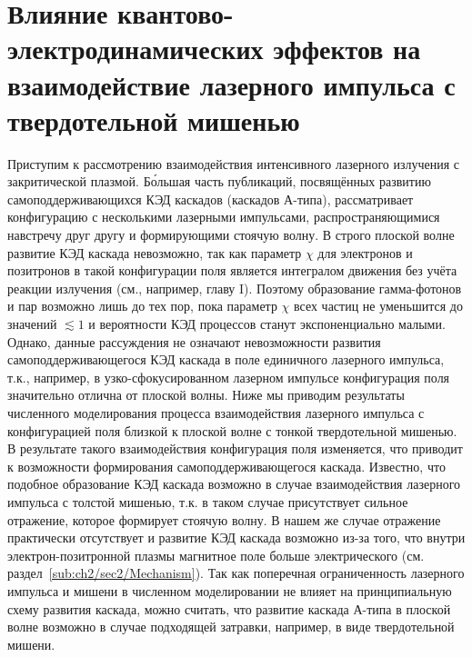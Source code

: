 \section{Влияние квантово-электродинамических эффектов на взаимодействие лазерного импульса с твердотельной мишенью}
\label{sec:ch2/sec2}

Приступим к рассмотрению взаимодействия интенсивного лазерного излучения с закритической плазмой. 
Б\'{о}льшая часть публикаций, посвящённых развитию самоподдерживающихся КЭД каскадов (каскадов А-типа), рассматривает конфигурацию с несколькими лазерными импульсами, распространяющимися навстречу друг другу и формирующими стоячую волну.
В строго плоской волне развитие КЭД каскада невозможно, так как параметр $\chi$ для электронов и позитронов в такой конфигурации поля является интегралом движения без учёта реакции излучения (см., например, главу I).
Поэтому образование гамма-фотонов и пар возможно лишь до тех пор, пока параметр $\chi$ всех частиц не уменьшится до значений $\lesssim 1$ и вероятности КЭД процессов станут экспоненциально малыми.
Однако, данные рассуждения не означают невозможности развития самоподдерживающегося КЭД каскада в поле единичного лазерного импульса, т.к., например, в узко-сфокусированном лазерном импульсе конфигурация поля значительно отлична от плоской волны.
Ниже мы приводим результаты численного моделирования процесса взаимодействия лазерного импульса с конфигурацией поля близкой к плоской волне с тонкой твердотельной мишенью.
В результате такого взаимодействия конфигурация поля изменяется, что приводит к возможности формирования самоподдерживающегося каскада.
Известно, что подобное образование КЭД каскада возможно в случае взаимодействия лазерного импульса с толстой мишенью, т.к. в таком случае присутствует сильное отражение, которое формирует стоячую волну.
В нашем же случае отражение практически отсутствует и развитие КЭД каскада возможно из-за того, что внутри электрон-позитронной плазмы магнитное поле больше электрического (см. раздел~\ref{sub:ch2/sec2/Mechanism}).
Так как поперечная ограниченность лазерного импульса и мишени в численном моделировании не влияет на принципиальную схему развития каскада, можно считать, что развитие каскада А-типа в плоской волне возможно в случае подходящей затравки, например, в виде твердотельной мишени.

